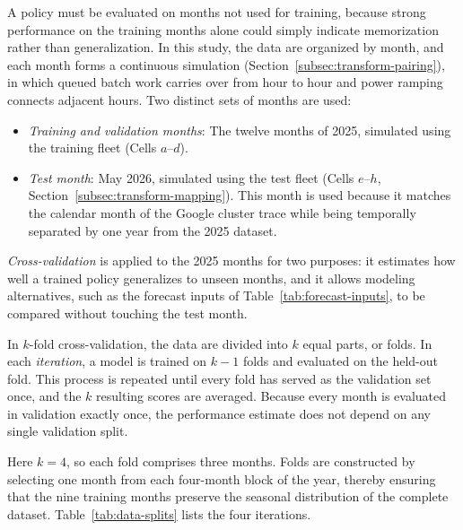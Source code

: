\documentclass{UNCC-thesis}
\begin{document}
A policy must be evaluated on months not used for training, because strong performance on
the training months alone could simply indicate memorization rather than generalization. In
this study, the data are organized by month, and each month forms a continuous simulation
(Section~\ref{subsec:transform-pairing}), in which queued batch work carries over from
hour to hour and power ramping connects adjacent hours. Two distinct sets
of months are used:
\begin{itemize}
  \item \emph{Training and validation months}: The twelve months of 2025,
        simulated using the training fleet (Cells \(a\)--\(d\)).
  \item \emph{Test month}: May 2026, simulated using the test fleet (Cells
        \(e\)--\(h\), Section~\ref{subsec:transform-mapping}). This month is
        used because it matches the calendar month of the Google cluster trace while
        being temporally separated by one year from the 2025 dataset.
\end{itemize}

\emph{Cross-validation} is applied to the 2025 months for two purposes: it
estimates how well a trained policy generalizes to unseen months,
and it allows modeling alternatives, such as the forecast inputs of
Table~\ref{tab:forecast-inputs}, to be compared without touching the test month.

In \(k\)-fold cross-validation, the data are divided into \(k\) equal parts, or
folds. In each \emph{iteration}, a model is trained on \(k-1\) folds and evaluated on the
held-out fold.
This process is repeated until every fold has served as the validation set once,
and the \(k\) resulting scores are averaged. Because every month is evaluated in validation
exactly once, the performance estimate does not depend on any single validation split.

Here \(k=4\), so each fold comprises three months. Folds are
constructed by selecting one month from each four-month block of the year,
thereby ensuring that the nine training months preserve the
seasonal distribution of the complete dataset.
Table~\ref{tab:data-splits} lists the four iterations.
\end{document}
